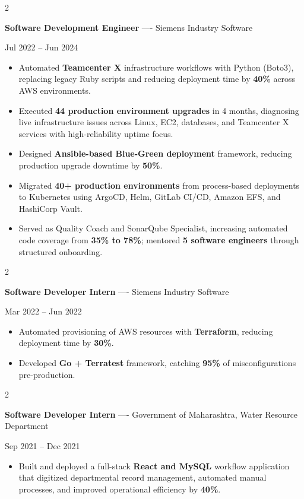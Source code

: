 \documentclass[10pt, letterpaper]{article}
\newenvironment{highlights}{
    \begin{itemize}[
        topsep=0.10 cm,
        parsep=0.06 cm,
        partopsep=0pt,
        itemsep=0.06 cm,
        leftmargin=12pt
    ]
}{
    \end{itemize}
}
\newenvironment{twocolentry}[2][]{
    \onecolentry
    \def\secondColumn{#2}
    \setcolumnwidth{\fill, 4.5 cm}
    \begin{paracol}{2}
}{
    \switchcolumn \raggedleft \secondColumn
    \end{paracol}
    \endonecolentry
}
\begin{document}
\vspace{0.15 cm}

\begin{twocolentry}{Jul 2022 -- Jun 2024}
\textbf{Software Development Engineer} ---- Siemens Industry Software
\end{twocolentry}
\begin{highlights}
  \item Automated \textbf{Teamcenter X} infrastructure workflows with Python (Boto3), replacing legacy Ruby scripts and reducing deployment time by \textbf{40\%} across AWS environments.
  \item Executed \textbf{44 production environment upgrades} in 4 months, diagnosing live infrastructure issues across Linux, EC2, databases, and Teamcenter X services with high-reliability uptime focus.
  \item Designed \textbf{Ansible-based Blue-Green deployment} framework, reducing production upgrade downtime by \textbf{50\%}.
  \item Migrated \textbf{40+ production environments} from process-based deployments to Kubernetes using ArgoCD, Helm, GitLab CI/CD, Amazon EFS, and HashiCorp Vault.
  \item Served as Quality Coach and SonarQube Specialist, increasing automated code coverage from \textbf{35\% to 78\%}; mentored \textbf{5 software engineers} through structured onboarding.
\end{highlights}

\vspace{0.15 cm}

\begin{twocolentry}{Mar 2022 -- Jun 2022}
\textbf{Software Developer Intern} ---- Siemens Industry Software
\end{twocolentry}
\begin{highlights}
  \item Automated provisioning of AWS resources with \textbf{Terraform}, reducing deployment time by \textbf{30\%}.
  \item Developed \textbf{Go + Terratest} framework, catching \textbf{95\%} of misconfigurations pre-production.
\end{highlights}

\vspace{0.15 cm}

\begin{twocolentry}{Sep 2021 -- Dec 2021}
\textbf{Software Developer Intern} ---- Government of Maharashtra, Water Resource Department
\end{twocolentry}
\begin{highlights}
  \item Built and deployed a full-stack \textbf{React and MySQL} workflow application that digitized departmental record management, automated manual processes, and improved operational efficiency by \textbf{40\%}.
\end{highlights}
\end{document}
